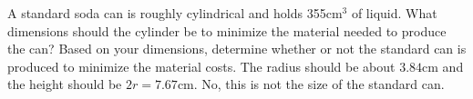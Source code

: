 {A standard soda can is roughly cylindrical and holds 355cm$^3$ of liquid. What dimensions should the cylinder be to minimize the material needed to produce the can? Based on your dimensions, determine whether or not the standard can is produced to minimize the material costs.
}
{The radius should be about $3.84$cm and the height should be $2r=7.67$cm. No, this is not the size of the standard can.
}

